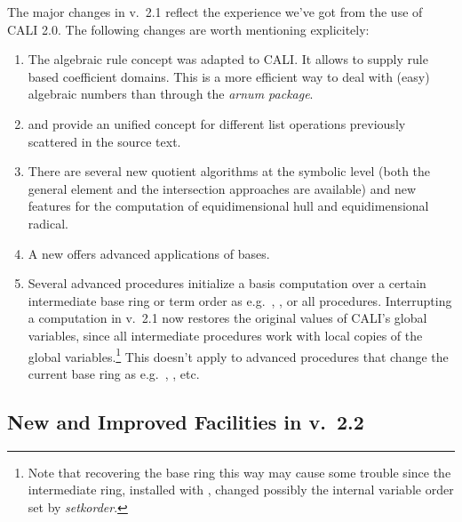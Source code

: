 The major changes in v.\ 2.1 reflect the experience we've got from the
use of CALI 2.0. The following changes are worth mentioning
explicitely:
\begin{enumerate}
\item The algebraic rule concept was adapted to CALI. It allows to
supply rule based coefficient domains. This is a more efficient way
to deal with (easy) algebraic numbers than through the {\em arnum
package}.

\item {} and  provide an unified
concept for different list operations previously scattered in the
source text.

\item There are several new quotient algorithms at the symbolic level
(both the general element and the intersection approaches are
available) and new features for the computation of equidimensional
hull and equidimensional radical.

\item A new  offers advanced applications of \gr
bases.

\item Several advanced procedures initialize a \gr basis computation
over a certain intermediate base ring or term order as e.g.\
, ,  or all
 procedures. Interrupting a computation in
v.\ 2.1 now restores the original values of CALI's global variables,
since all intermediate procedures work with local copies of 
the global variables.\footnote{Note that recovering the base
ring this way may cause some trouble since the intermediate ring,
installed with \ind{setring}, changed possibly the internal variable
order set by {\em setkorder}.} This doesn't apply to advanced
procedures that change the current base ring as e.g.\ ,
\ind{preimage}, \ind{sym} etc.

\end{enumerate}

\subsection{New and Improved Facilities in v.\ 2.2}

